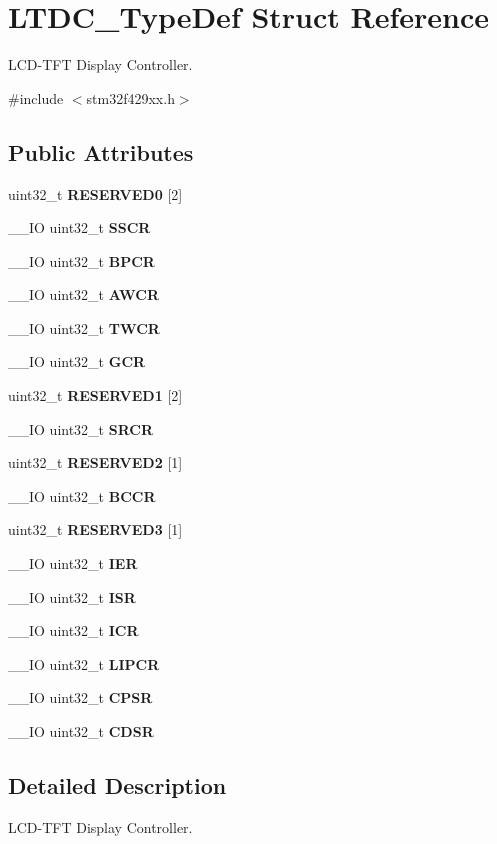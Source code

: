 \section{L\+T\+D\+C\+\_\+\+Type\+Def Struct Reference}
\label{structLTDC__TypeDef}


L\+C\+D-\/\+T\+FT Display Controller.  




{\ttfamily \#include $<$stm32f429xx.\+h$>$}

\subsection*{Public Attributes}
\begin{DoxyCompactItemize}
\item 
uint32\+\_\+t \textbf{ R\+E\+S\+E\+R\+V\+E\+D0} [2]
\item 
\+\_\+\+\_\+\+IO uint32\+\_\+t \textbf{ S\+S\+CR}
\item 
\+\_\+\+\_\+\+IO uint32\+\_\+t \textbf{ B\+P\+CR}
\item 
\+\_\+\+\_\+\+IO uint32\+\_\+t \textbf{ A\+W\+CR}
\item 
\+\_\+\+\_\+\+IO uint32\+\_\+t \textbf{ T\+W\+CR}
\item 
\+\_\+\+\_\+\+IO uint32\+\_\+t \textbf{ G\+CR}
\item 
uint32\+\_\+t \textbf{ R\+E\+S\+E\+R\+V\+E\+D1} [2]
\item 
\+\_\+\+\_\+\+IO uint32\+\_\+t \textbf{ S\+R\+CR}
\item 
uint32\+\_\+t \textbf{ R\+E\+S\+E\+R\+V\+E\+D2} [1]
\item 
\+\_\+\+\_\+\+IO uint32\+\_\+t \textbf{ B\+C\+CR}
\item 
uint32\+\_\+t \textbf{ R\+E\+S\+E\+R\+V\+E\+D3} [1]
\item 
\+\_\+\+\_\+\+IO uint32\+\_\+t \textbf{ I\+ER}
\item 
\+\_\+\+\_\+\+IO uint32\+\_\+t \textbf{ I\+SR}
\item 
\+\_\+\+\_\+\+IO uint32\+\_\+t \textbf{ I\+CR}
\item 
\+\_\+\+\_\+\+IO uint32\+\_\+t \textbf{ L\+I\+P\+CR}
\item 
\+\_\+\+\_\+\+IO uint32\+\_\+t \textbf{ C\+P\+SR}
\item 
\+\_\+\+\_\+\+IO uint32\+\_\+t \textbf{ C\+D\+SR}
\end{DoxyCompactItemize}


\subsection{Detailed Description}
L\+C\+D-\/\+T\+FT Display Controller. 

